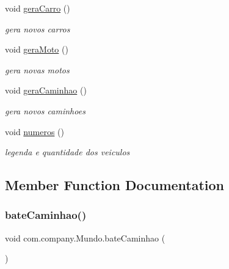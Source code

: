 \begin{DoxyCompactItemize}
\mbox{\label{classcom_1_1company_1_1_mundo_a9b4b7ab2613e1ea384082f88ac058b16}} 
void \mbox{\hyperlink{classcom_1_1company_1_1_mundo_a9b4b7ab2613e1ea384082f88ac058b16}{gera\+Carro}} ()
\begin{DoxyCompactList}\small\item\em gera novos carros \end{DoxyCompactList}\item 
\mbox{\label{classcom_1_1company_1_1_mundo_a4bba8d8f6f846ec65facf10196d7c619}} 
void \mbox{\hyperlink{classcom_1_1company_1_1_mundo_a4bba8d8f6f846ec65facf10196d7c619}{gera\+Moto}} ()
\begin{DoxyCompactList}\small\item\em gera novas motos \end{DoxyCompactList}\item 
\mbox{\label{classcom_1_1company_1_1_mundo_ad0ce55f809bf999ee3271c6e970561dc}} 
void \mbox{\hyperlink{classcom_1_1company_1_1_mundo_ad0ce55f809bf999ee3271c6e970561dc}{gera\+Caminhao}} ()
\begin{DoxyCompactList}\small\item\em gera novos caminhoes \end{DoxyCompactList}\item 
void \mbox{\hyperlink{classcom_1_1company_1_1_mundo_afd89839275a49ac20884b5e402ae374a}{numeros}} ()
\begin{DoxyCompactList}\small\item\em legenda e quantidade dos veiculos \end{DoxyCompactList}\end{DoxyCompactItemize}


\subsection{Member Function Documentation}
\mbox{\label{classcom_1_1company_1_1_mundo_acd75d27967e52000cf6558424daa34c7}} 
\subsubsection{\texorpdfstring{bate\+Caminhao()}{bateCaminhao()}}
{\footnotesize\ttfamily void com.\+company.\+Mundo.\+bate\+Caminhao (\begin{DoxyParamCaption}{ }\end{DoxyParamCaption})\hspace{0.3cm}{\ttfamily [inline]}}



